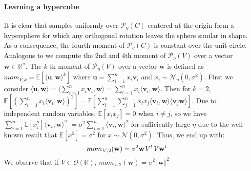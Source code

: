 \documentclass[12 pt]{article}        	%
\newcommand{\PP}[2][]{\mathcal{P}_{#1}(\mat{#2})}
\newcommand{\mat}[1]{\mathit{#1}}
\renewcommand{\vec}[1]{\mathbf{#1}}
\newcommand{\bb}[1]{\mathbb{#1}}
\begin{document}
\paragraph{Learning a hypercube}
It is clear that samples uniformly over $\PP[\eta]{C}$ centered at the origin form a hypersphere for which any orthogonal rotation leaves the sphere similar in shape. 
As a consequence, the fourth moment of $\PP[\eta]{C}$ is constant over the unit circle. \\ 

Analogous to \cite{NR09} we compute the 2nd and 4th moment of $\PP[\eta]{V}$ over a vector $\vec{w} \in \bb{R}^n$.
The \textit{k}-th moment of $\PP[\eta]{V}$ over a vector $\vec{w}$ is defined as $mom_{\mat{V}, k} = \bb{E}[\langle \vec{u}, \vec{w} \rangle ^k]$ where $\vec{u} = \sum_{i=1}^{n} x_i \vec{v}_i$ and $x_i \sim \mathcal{N}_{\eta}(0, \sigma^2)$.
First we consider $\langle \vec{u}, \vec{w} \rangle = \langle \sum_{i=1}^{n} x_i\vec{v}_i, \vec{w}\rangle = \sum_{i=1}^{n}x_i \langle\vec{v}_i, \vec{w} \rangle$.
Then for $k=2$, $\bb{E}[(\sum_{i=1}^{n}x_i \langle\vec{v}_i, \vec{w} \rangle)^2] = \bb{E}[\sum_{i=1}^{n} \sum_{j=1}^{n} x_i x_j \langle \vec{v}_i, \vec{w} \rangle \langle \vec{v}_j \vec{w} \rangle]$.
Due to independent random variables, $\bb{E}[x_i x_j] = 0$ when $i \neq j$, so we have $ \sum_{i=1}^{n}\bb{E}[x_i^2]\langle \vec{v}_i, \vec{w} \rangle^2$ 
$= \sigma^2 \sum_{i=1}^{n}\langle \vec{v}_i, \vec{w} \rangle^2$ for sufficiently large $\eta$ due to the well known result that $\bb{E}[x^2] = \sigma^2$ for $x \sim \mathcal{N}(0, \sigma^2)$.
Thus, we end up with:
\begin{equation}
mom_{\mat{V}, 2}(\vec{w}) = \sigma^2 \vec{w}\mat{V}^t\mat{V}\vec{w}^t \\
\end{equation}
We observe that if $\mat{V} \in \mathcal{O}(\bb{R})$, $mom_{\mat{V}, 2}(\vec{w}) = \sigma^2 \left \Vert \vec{w} \right \Vert^2$ \\
\end{document}
